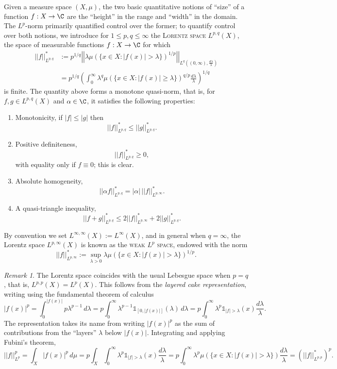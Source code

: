 \documentclass[reqno]{amsart}
\theoremstyle{definition}
\theoremstyle{remark}
\newtheorem*{remark}{Remark}
\renewcommand{\emph}{\textsc}
\begin{document}
Given a measure space $(X, \mu)$, the two basic quantitative notions of ``size'' of a function $f: X \to \C$ are the ``height''  in the range and ``width'' in the domain. The $L^p$-norm primarily quantified control over the former; to quantify control over both notions, we introduce for $1 \leq p, q \leq \infty$ the \emph{Lorentz space} $L^{p, q} (X)$, the space of measurable functions $f: X \to \C$ for which 
	\begin{align*}
		 ||f||_{L^{p, q}}^* 
		 	&:= p^{1/q} \left|\left| \lambda \mu (\{ x \in X : |f(x)| > \lambda \})^{1/p} \right|\right|_{L^q ((0, \infty), \frac{d\lambda}{\lambda})} \\
		 	&= p^{1/q} \left( \int_0^\infty \lambda^q \mu (\{ x \in X : |f(x)| \geq \lambda \})^{q/p} \frac{d\lambda}{\lambda} \right)^{1/q}
	\end{align*}	 	
is finite. The quantity above forms a monotone quasi-norm, that is, for $f, g \in L^{p, q} (X)$ and $\alpha \in \C$, it satisfies the following properties: 
\begin{enumerate}
	\item Monotonicity, if $|f| \leq |g|$ then 
				\[ ||f||^*_{L^{p, q}} \leq ||g||^*_{L^{p, q}}. \]
				
	\item Positive definiteness, 
				\[||f||^*_{L^{p, q}} \geq 0,\]
			with equality only if $f \equiv 0$; this is clear.
			
	\item Absolute homogeneity, 
				\[ ||\alpha f||_{L^{p, q}}^* = |\alpha| \, ||f||^*_{L^{p, \infty}}. \]
				
	\item A quasi-triangle inequality,
				\[ ||f + g||_{L^{p, q}}^* \leq 2 ||f||^*_{L^{p, \infty}} + 2 ||g||^*_{L^{p, q}}. \]
\end{enumerate}
By convention we set $L^{\infty, \infty} (X) := L^\infty(X)$, and in general when $q = \infty$, the Lorentz space $L^{p, \infty} (X)$ is known as the \emph{weak $L^p$ space}, endowed with the norm
	\[ ||f||^*_{L^{p, \infty}} := \sup_{\lambda > 0} \lambda \mu(\{ x \in X : |f(x)| > \lambda\})^{1/p}. \]
\begin{remark}
	The Lorentz space coincides with the usual Lebesgue space when $p = q$, that is, $L^{p, p} (X) = L^p (X)$. This follows from the \textit{layered cake representation}, writing using the fundamental theorem of calculus
	\[ |f(x)|^p = \int_0^{|f(x)|} p \lambda^{p - 1} \, d\lambda = p \int_0^\infty \lambda^{p - 1} \mathbb 1_{[0, |f(x)|]}(\lambda) \, d\lambda = p \int_0^\infty  \lambda^{p} \mathbb 1_{|f| > \lambda} (x) \frac{d \lambda}{\lambda}. \] 
	The representation takes its name from writing $|f(x)|^p$ as the sum of contributions from the ``layers'' $\lambda$ below $|f(x)|$. Integrating and applying Fubini's theorem, 	
		\[ ||f||_{L^p}^p = \int_X |f(x)|^p \, d\mu =p \int_X \int_0^\infty \lambda^{p } \mathbb 1_{|f |> \lambda} (x) \frac{d \lambda}{\lambda} = p\int_0^\infty \lambda^{p } \mu (\{ x \in X : |f(x)| > \lambda \}) \frac{d\lambda}{\lambda} = \left(||f||_{L^{p, p}}^*\right)^p. \]
\end{remark}
\end{document}
